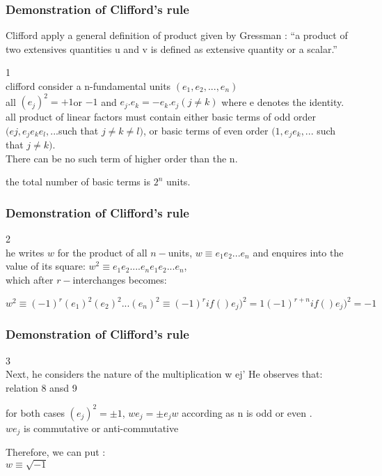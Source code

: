 \label{columns}
\begin{frame}\frametitle{Demonstration of Clifford’s rule }

Clifford apply a general definition of product given by Gressman : “a product of two extensives quantities u and v is defined as extensive quantity or a scalar.”

1\\

clifford consider a n-fundamental units $(e_1,e_2,...,e_n)$ \\

all $(e_j)^2=+1$or $-1$  and $e_j.e_k=-e_k.e_j (j \neq k)$ where e denotes the identity. 
all product of linear factors must contain either basic terms of odd order $(ej, e_j e_k e_l, ... $such that $j \neq k \neq l)$,
or basic terms of even order $( 1, e_j e_k, ...$ such that $j \neq k)$. \\

There can be no such term of higher order than the n. 

the total number of basic terms is $2^n$ units.




\end{frame}


\begin{frame}\frametitle{Demonstration of Clifford’s rule }
2\\

he writes $w$ for the product of all $n-$units, $w \equiv e_1 e_2...e_n$ and enquires into the value of its square:
$w^2 \equiv e_1 e_2....e_n e_1 e_2...e_n$,\\
which after $r-$interchanges becomes:   

$w^2 \equiv  (-1)^r (e_{1})^2 (e_{2})^2 ...(e_{n})^2  \equiv (-1)^r if ()e_j)^2=1 (-1)^{r+n} if ()e_j)^2=-1$

\end{frame}



\begin{frame}\frametitle{Demonstration of Clifford’s rule }
3\\

 Next, he considers the nature of the multiplication w ej' He observes that:\\
 
relation 8 ansd 9 
 
for both cases $(e_j)^2 = \pm 1$, $w e_j = \pm e_j w$ according as n is odd or even .\\
 
 
 $w e_j $ is commutative or anti-commutative 
 

Therefore, we can put :\\

$w \equiv \sqrt{-1}$ 
\end{frame}


